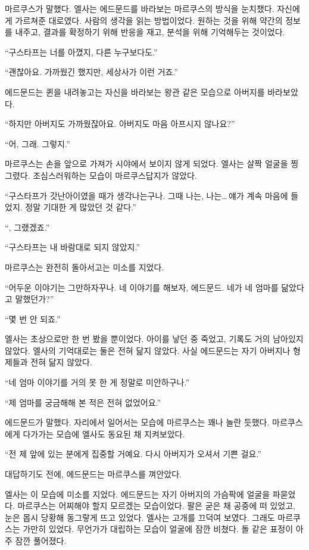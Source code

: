 마르쿠스가 말했다. 엘사는 에드문드를 바라보는 마르쿠스의 방식을 눈치챘다. 자신에게 가르쳐준 대로였다. 사람의 생각을 읽는 방법이었다. 원하는 것을 위해 약간의 정보를 내주고, 결과를 확정하기 위해 반응을 재고, 분석을 위해 기억해두는 것이었다.

``구스타프는 너를 아꼈지, 다른 누구보다도.''

``괜찮아요. 가까웠긴 했지만, 세상사가 이런 거죠.''

에드문드는 퀸을 내려놓고는 자신을 바라보는 왕관 같은 모습으로 아버지를 바라보았다.

``하지만 아버지도 가까웠잖아요. 아버지도 마음 아프시지 않나요?''

``어, 그래. 그렇지.''

마르쿠스는 손을 앞으로 가져가 시야에서 보이지 않게 되었다. 엘사는 살짝 얼굴을 찡그렸다. 조심스러워하는 모습이 마르쿠스답지가 않았다.

``구스타프가 갓난아이였을 때가 생각나는구나. 그때 나는, 나는\ldots\,얘가 계속 마음에 들었지. 정말 기대한 게 많았던 것 같다.''

``, 그랬겠죠.''

``구스타프는 내 바람대로 되지 않았지.''

마르쿠스는 완전히 돌아서고는 미소를 지었다.

``어두운 이야기는 그만하자꾸나. 네 이야기를 해보자, 에드문드. 네가 네 엄마를 닮았다고 말했던가?''

``몇 번 안 되죠.''

엘사는 초상으로만 한 번 봤을 뿐이었다. 아이를 낳던 중 죽었고, 기록도 거의 남아있지 않았다. 엘사의 기억대로는 둘은 전혀 닮지 않았다. 사실 에드문드는 자기 아버지나 형제들과 전혀 닮지 않았다.

``네 엄마 이야기를 거의 못 한 게 정말로 미안하구나.''

``제 엄마를 궁금해해 본 적은 전혀 없었어요.''

에드문드가 말했다. 자리에서 일어서는 모습에 마르쿠스는 꽤나 놀란 듯했다. 마르쿠스에게 다가가는 모습에 엘사도 동요된 채 지켜보았다.

``전 제 앞에 있는 분에게 집중할 거예요. 다시 아버지가 오셔서 기쁜 걸요.''

대답하기도 전에, 에드문드는 마르쿠스를 껴안았다.

엘사는 이 모습에 미소를 지었다. 에드문드는 자기 아버지의 가슴팍에 얼굴을 파묻었다. 마르쿠스는 어찌해야 할지 모르겠는 모습이었다. 팔은 굳은 채 공중에 떠 있었고, 눈은 몹시 당황해 동그랗게 뜨고 있었다. 엘사는 고개를 끄덕여 보였다. 그래도 마르쿠스는 가만히 있었다. 무언가가 대립하는 모습이 얼굴에 잠깐 비쳤다. 돌 같은 표정이 아주 잠깐 풀어졌다.

